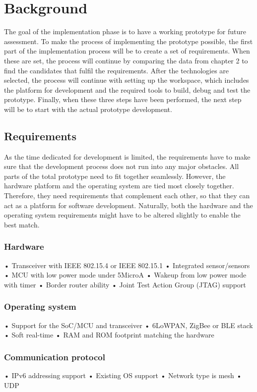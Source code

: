 \section{Background}

The goal of the implementation phase is to have a working prototype for future assessment.
To make the process of implementing the prototype possible,
	the first part of the implementation process will be to create a set of requirements.
When these are set,
	the process will continue by comparing the data from chapter 2 to find the candidates that fulfil the requirements.
After the technologies are selected,
	the process will continue with setting up the workspace,
	which includes the platform for development and the required tools to build,
	debug and test the prototype.
Finally,
	when these three steps have been performed,
	the next step will be to start with the actual prototype development.
	
\subsection{Requirements}
As the time dedicated for development is limited,
	the requirements have to make sure that the development process does not run into any major obstacles.
All parts of the total prototype need to fit together seamlessly.
However,
	the hardware platform and the operating system are tied most closely together.
Therefore,
	they need requirements that complement each other,
	so that they can act as a platform for software development.
Naturally,
	both the hardware and the operating system requirements might have to be altered slightly to enable the best match.

\subsubsection{Hardware}
• Transceiver with IEEE 802.15.4 or IEEE 802.15.1
• Integrated sensor/sensors
• MCU with low power mode under 5MicroA
• Wakeup from low power mode with timer
• Border router ability
• Joint Test Action Group (JTAG) support

\subsubsection{Operating system}
• Support for the SoC/MCU and transceiver
• 6LoWPAN, ZigBee or BLE stack
• Soft real-time
• RAM and ROM footprint matching the hardware

\subsubsection{Communication protocol}
• IPv6 addressing support
• Existing OS support
• Network type is mesh
• UDP

